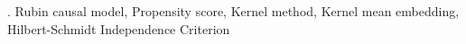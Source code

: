 \documentclass[12pt]{article}
\begin{document}
\vskip 2mm

.
Rubin causal model, Propensity score, Kernel method, Kernel mean embedding, Hilbert-Schmidt Independence Criterion

%        
%
%        








\end{document}
